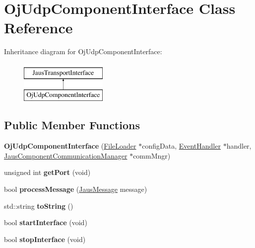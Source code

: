 \hypertarget{class_oj_udp_component_interface}{\section{\-Oj\-Udp\-Component\-Interface \-Class \-Reference}
\label{class_oj_udp_component_interface}
}
\-Inheritance diagram for \-Oj\-Udp\-Component\-Interface\-:\begin{figure}[H]
\begin{center}
\leavevmode
\includegraphics[height=2.000000cm]{class_oj_udp_component_interface}
\end{center}
\end{figure}
\subsection*{\-Public \-Member \-Functions}
\begin{DoxyCompactItemize}
\item 
\hypertarget{class_oj_udp_component_interface_a1c42180572259b51f1a03ee2108f4962}{{\bfseries \-Oj\-Udp\-Component\-Interface} (\hyperlink{class_file_loader}{\-File\-Loader} $\ast$config\-Data, \hyperlink{class_event_handler}{\-Event\-Handler} $\ast$handler, \hyperlink{class_jaus_component_communication_manager}{\-Jaus\-Component\-Communication\-Manager} $\ast$comm\-Mngr)}\label{class_oj_udp_component_interface_a1c42180572259b51f1a03ee2108f4962}

\item 
\hypertarget{class_oj_udp_component_interface_a540fbf9996391d87c12596cc18a13767}{unsigned int {\bfseries get\-Port} (void)}\label{class_oj_udp_component_interface_a540fbf9996391d87c12596cc18a13767}

\item 
\hypertarget{class_oj_udp_component_interface_af7fbdac16fb1eaf533b2cf4052963289}{bool {\bfseries process\-Message} (\hyperlink{struct_jaus_message_struct}{\-Jaus\-Message} message)}\label{class_oj_udp_component_interface_af7fbdac16fb1eaf533b2cf4052963289}

\item 
\hypertarget{class_oj_udp_component_interface_a2e288fa7b0f170fcff009da55cc7197c}{std\-::string {\bfseries to\-String} ()}\label{class_oj_udp_component_interface_a2e288fa7b0f170fcff009da55cc7197c}

\item 
\hypertarget{class_oj_udp_component_interface_a7659dcd82e65363248de2d4e1555ab73}{bool {\bfseries start\-Interface} (void)}\label{class_oj_udp_component_interface_a7659dcd82e65363248de2d4e1555ab73}

\item 
\hypertarget{class_oj_udp_component_interface_aae25149e3f7ee2bb5a414201769a47f2}{bool {\bfseries stop\-Interface} (void)}\label{class_oj_udp_component_interface_aae25149e3f7ee2bb5a414201769a47f2}

\end{DoxyCompactItemize}
